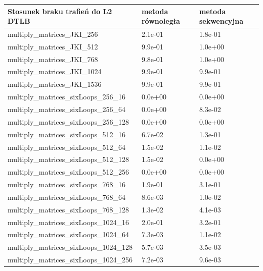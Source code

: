 \documentclass{scrartcl}
\begin{document}
\begin{table}[H]
\begin{tabular}{|l|l|l|}
\hline
Stosunek braku trafień do L2 DTLB & metoda równoległa & metoda sekwencyjna \\ \hline
multiply\_matrices\_JKI\_256      & 2.1e-01           & 1.8e-01            \\ \hline
multiply\_matrices\_JKI\_512      & 9.9e-01           & 1.0e+00            \\ \hline
multiply\_matrices\_JKI\_768      & 9.8e-01           & 1.0e+00            \\ \hline
multiply\_matrices\_JKI\_1024     & 9.9e-01           & 9.9e-01            \\ \hline
multiply\_matrices\_JKI\_1536     & 9.9e-01           & 9.9e-01            \\ \hline
multiply\_matrices\_sixLoops\_256\_16   & 0.0e+00           & 0.0e+00            \\ \hline
multiply\_matrices\_sixLoops\_256\_64   & 0.0e+00           & 8.3e-02            \\ \hline
multiply\_matrices\_sixLoops\_256\_128  & 0.0e+00           & 0.0e+00            \\ \hline
multiply\_matrices\_sixLoops\_512\_16   & 6.7e-02           & 1.3e-01            \\ \hline
multiply\_matrices\_sixLoops\_512\_64   & 1.5e-02           & 1.1e-02            \\ \hline
multiply\_matrices\_sixLoops\_512\_128  & 1.5e-02           & 0.0e+00            \\ \hline
multiply\_matrices\_sixLoops\_512\_256  & 0.0e+00           & 0.0e+00            \\ \hline
multiply\_matrices\_sixLoops\_768\_16   & 1.9e-01           & 3.1e-01            \\ \hline
multiply\_matrices\_sixLoops\_768\_64   & 8.6e-03           & 1.0e-02            \\ \hline
multiply\_matrices\_sixLoops\_768\_128  & 1.3e-02           & 4.1e-03            \\ \hline
multiply\_matrices\_sixLoops\_1024\_16  & 2.0e-01           & 3.2e-01            \\ \hline
multiply\_matrices\_sixLoops\_1024\_64  & 7.3e-03           & 1.1e-02            \\ \hline
multiply\_matrices\_sixLoops\_1024\_128 & 5.7e-03           & 3.5e-03            \\ \hline
multiply\_matrices\_sixLoops\_1024\_256 & 7.2e-03           & 9.6e-03            \\ \hline

\end{tabular}
\end{table}
\end{document}
